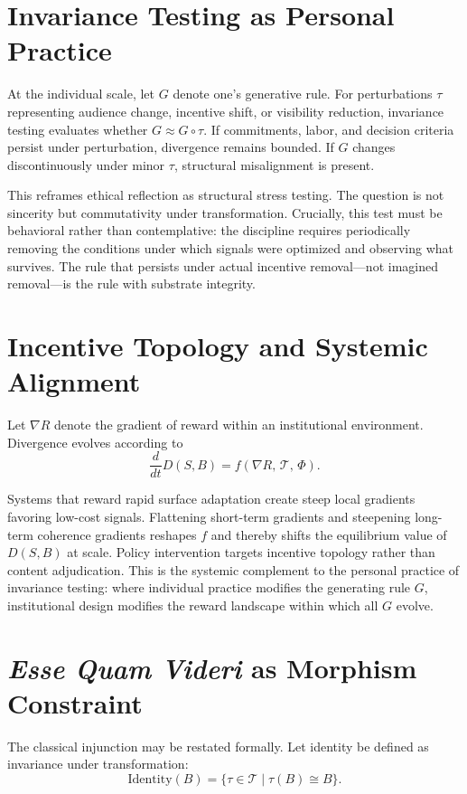 \documentclass[11pt]{article}
\begin{document}
\section{Invariance Testing as Personal Practice}

At the individual scale, let $G$ denote one's generative rule. For perturbations $\tau$ representing audience change, incentive shift, or visibility reduction, invariance testing evaluates whether $G \approx G \circ \tau$. If commitments, labor, and decision criteria persist under perturbation, divergence remains bounded. If $G$ changes discontinuously under minor $\tau$, structural misalignment is present.

This reframes ethical reflection as structural stress testing. The question is not sincerity but commutativity under transformation. Crucially, this test must be behavioral rather than contemplative: the discipline requires periodically removing the conditions under which signals were optimized and observing what survives. The rule that persists under actual incentive removal---not imagined removal---is the rule with substrate integrity.

\section{Incentive Topology and Systemic Alignment}

Let $\nabla R$ denote the gradient of reward within an institutional environment. Divergence evolves according to
\[
\frac{d}{dt} D(S,B) = f(\nabla R,\, \mathcal{T},\, \Phi).
\]

Systems that reward rapid surface adaptation create steep local gradients favoring low-cost signals. Flattening short-term gradients and steepening long-term coherence gradients reshapes $f$ and thereby shifts the equilibrium value of $D(S,B)$ at scale. Policy intervention targets incentive topology rather than content adjudication. This is the systemic complement to the personal practice of invariance testing: where individual practice modifies the generating rule $G$, institutional design modifies the reward landscape within which all $G$ evolve.

\section{\textit{Esse Quam Videri} as Morphism Constraint}

The classical injunction may be restated formally. Let identity be defined as invariance under transformation:
\[
\mathrm{Identity}(B) = \{\tau \in \mathcal{T} \mid \tau(B) \cong B\}.
\]
\end{document}
